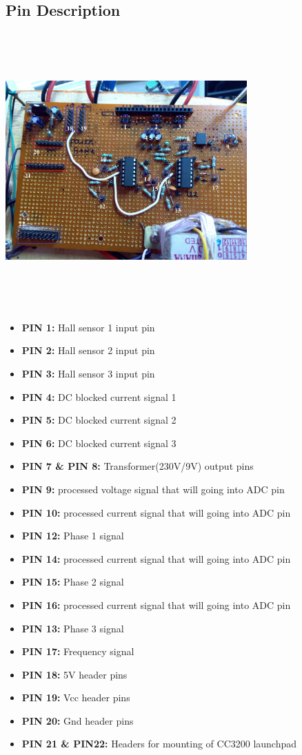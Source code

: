 \documentclass[a4paper,12pt,oneside]{book}
\begin{document}
\begin{appendices}
\section*{Pin Description}
\begin{center}
	\includegraphics[width=350px,height=400px]{board}
\end{center}
\begin{itemize}
	\item \textbf{PIN 1:} Hall sensor 1 input pin 
	\item \textbf{PIN 2:} Hall sensor 2 input pin
	\item \textbf{PIN 3:} Hall sensor 3 input pin
	\item \textbf{PIN 4:} DC blocked current signal 1
	\item \textbf{PIN 5:} DC blocked current signal 2
	\item \textbf{PIN 6:} DC blocked current signal 3
	\item \textbf{PIN 7 \& PIN 8:} Transformer(230V/9V) output pins
	\item \textbf{PIN 9:} processed voltage signal that will going into ADC pin
	\item \textbf{PIN 10:} processed current signal that will going into ADC pin
	\item \textbf{PIN 12:} Phase 1 signal 
	\item \textbf{PIN 14:} processed current signal that will going into ADC pin
	\item \textbf{PIN 15:} Phase 2 signal 
	\item \textbf{PIN 16:} processed current signal that will going into ADC pin
	\item \textbf{PIN 13:} Phase 3 signal 
	\item \textbf{PIN 17:} Frequency signal
	\item \textbf{PIN 18:} 5V header pins
	\item \textbf{PIN 19:} Vcc header pins
	\item \textbf{PIN 20:} Gnd header pins
	\item \textbf{PIN 21 \& PIN22:} Headers for mounting of CC3200 launchpad
\end{itemize}
\newpage

\end{appendices}
\end{document}

